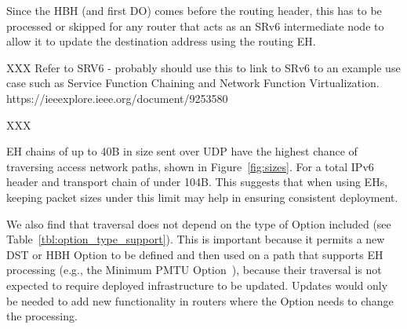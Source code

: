 \documentclass[conference]{IEEEtran}
\begin{document}

Since the HBH (and first DO) comes before the routing header, this has to be processed or skipped for any router that acts as an SRv6 intermediate node to allow it to update the destination address using the routing EH.

XXX
Refer to SRV6
- probably should use this to link to SRv6 to an example use  case such as Service Function Chaining and Network Function Virtualization.
https://ieeexplore.ieee.org/document/9253580

XXX



EH chains of up to 40B in size sent over UDP have the highest chance of traversing access network paths, shown in Figure~\ref{fig:sizes}.
For a total IPv6 header and transport chain of under 104B. This suggests that when using EHs, keeping packet sizes under this limit may help in ensuring consistent deployment.


We also find that traversal does not depend on the type of Option included (see Table~\ref{tbl:option_type_support}). This is important because it permits a new DST or HBH Option to be defined and then used on a path that supports EH processing (e.g., the Minimum PMTU  Option~\cite{rfc9268}), because their traversal is not expected to require deployed infrastructure to be updated. Updates would only be needed to add new functionality in routers where the Option needs to change the processing.
\end{document}
